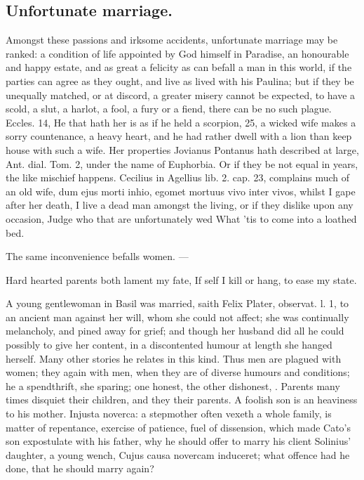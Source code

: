 {\subsection{Unfortunate marriage.}
Amongst these passions and irksome accidents,
unfortunate marriage may be ranked: a condition of life appointed by
God himself in Paradise, an honourable and happy estate, and as great a
felicity as can befall a man in this world, if the parties can
agree as they ought, and live as \Seneca lived with his Paulina;
but if they be unequally matched, or at discord, a greater misery
cannot be expected, to have a scold, a slut, a harlot, a fool, a fury
or a fiend, there can be no such plague. Eccles.  14, He that hath
her is as if he held a scorpion, \etc{}  25, a wicked wife makes a
sorry countenance, a heavy heart, and he had rather dwell with a lion
than keep house with such a wife. Her properties Jovianus
Pontanus hath described at large, Ant. dial. Tom. 2, under the name of
Euphorbia. Or if they be not equal in years, the like mischief happens.
Cecilius in Agellius lib. 2. cap. 23, complains much of an old wife,
dum ejus morti inhio, egomet mortuus vivo inter vivos, whilst I gape
after her death, I live a dead man amongst the living, or if they
dislike upon any occasion,
Judge who that are unfortunately wed
What 'tis to come into a loathed bed.

The same inconvenience befalls women.
---

Hard hearted parents both lament my fate,
If self I kill or hang, to ease my state.

A young gentlewoman in Basil was married, saith Felix Plater,
observat. l. 1, to an ancient man against her will, whom she could not
affect; she was continually melancholy, and pined away for grief; and
though her husband did all he could possibly to give her content, in a
discontented humour at length she hanged herself. Many other stories he
relates in this kind. Thus men are plagued with women; they again with
men, when they are of diverse humours and conditions; he a spendthrift,
she sparing; one honest, the other dishonest, \etc{}. Parents many times
disquiet their children, and they their parents. A foolish son is
an heaviness to his mother. Injusta noverca: a stepmother often vexeth
a whole family, is matter of repentance, exercise of patience, fuel of
dissension, which made Cato's son expostulate with his father, why he
should offer to marry his client Solinius' daughter, a young wench,
Cujus causa novercam induceret; what offence had he done, that he
should marry again?

}
